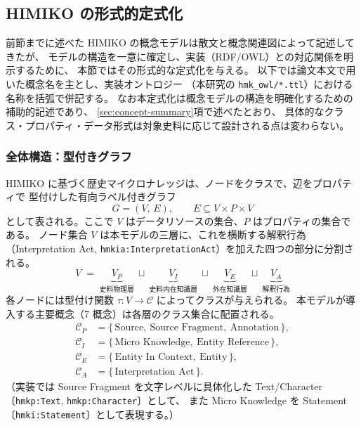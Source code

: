 %

\subsection{HIMIKO の形式的定式化}
\label{sec:himiko-formal}

前節までに述べた HIMIKO の概念モデルは散文と概念関連図によって記述してきたが、
モデルの構造を一意に確定し、実装（RDF/OWL）との対応関係を明示するために、
本節ではその形式的な定式化を与える。
以下では論文本文で用いた概念名を主とし、実装オントロジー
（本研究の \texttt{hmk\_owl/*.ttl}）における名称を括弧で併記する。
なお本定式化は概念モデルの構造を明確化するための補助的記述であり、
\ref{sec:concept-summary}項で述べたとおり、
具体的なクラス・プロパティ・データ形式は対象史料に応じて設計される点は変わらない。

\subsubsection*{全体構造：型付きグラフ}

HIMIKO に基づく歴史マイクロナレッジは、ノードをクラスで、辺をプロパティで
型付けした有向ラベル付きグラフ
\[
  G = (V,\, E), \qquad E \subseteq V \times P \times V
\]
として表される。ここで $V$ はデータリソースの集合、$P$ はプロパティの集合である。
ノード集合 $V$ は本モデルの三層に、これを横断する解釈行為
（Interpretation Act, \texttt{hmkia:InterpretationAct}）を加えた四つの部分に分割される。
\[
  V \;=\;
  \underbrace{V_{P}}_{\text{史料物理層}} \ \sqcup\
  \underbrace{V_{I}}_{\text{史料内在知識層}} \ \sqcup\
  \underbrace{V_{E}}_{\text{外在知識層}} \ \sqcup\
  \underbrace{V_{A}}_{\text{解釈行為}}
\]
各ノードには型付け関数 $\tau : V \to \mathcal{C}$ によってクラスが与えられる。
本モデルが導入する主要概念（7 概念）は各層のクラス集合に配置される。
\begin{align*}
  \mathcal{C}_P &= \{\,\text{Source},\ \text{Source Fragment},\ \text{Annotation}\,\}, \\
  \mathcal{C}_I &= \{\,\text{Micro Knowledge},\ \text{Entity Reference}\,\}, \\
  \mathcal{C}_E &= \{\,\text{Entity In Context},\ \text{Entity}\,\}, \\
  \mathcal{C}_A &= \{\,\text{Interpretation Act}\,\}.
\end{align*}
（実装では Source Fragment を文字レベルに具体化した Text/Character
〔\texttt{hmkp:Text}, \texttt{hmkp:Character}〕として、
また Micro Knowledge を Statement〔\texttt{hmki:Statement}〕として表現する。）

